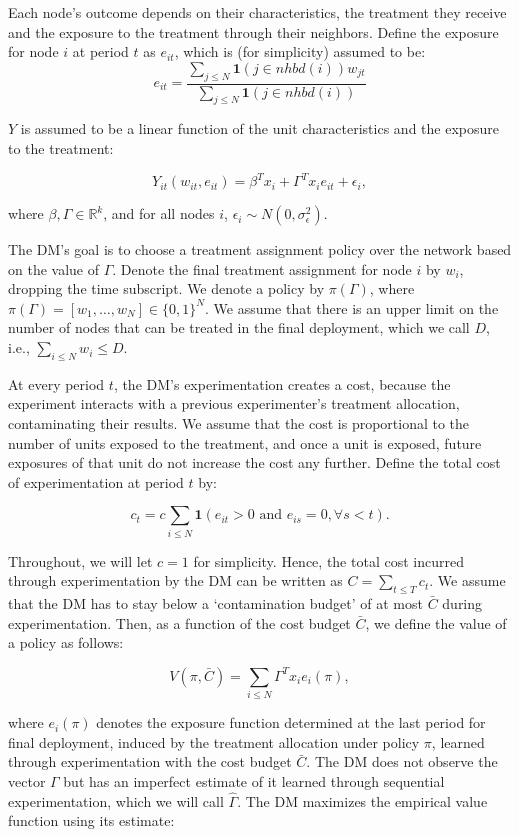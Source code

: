 \documentclass[11pt,a4paper]{article}
\begin{document}
Each node's outcome depends on their characteristics, the treatment they receive and the exposure to the treatment through their neighbors. Define the exposure for node $i$ at period $t$ as $e_{it}$, which is (for simplicity) assumed to be: 
$$e_{it} = \frac { \sum_{j \leq N}  \mathbf{1}(j \in nhbd(i)) w_{jt}}{ \sum_{j \leq N} \mathbf{1}(j \in nhbd(i)) }$$

$Y$ is assumed to be a linear function of the unit characteristics and the exposure to the treatment:

$$Y_{it}( w_{it}, e_{it}) = \beta^T x_i + \Gamma^T x_i e_{it} + \epsilon_i,$$

where $\beta, \Gamma \in \mathbb{R}^k$, and for all nodes $i$, $\epsilon_i \sim N(0, \sigma^2_\epsilon)$.

 The DM's goal is to choose a treatment assignment policy over the network based on the value of $\Gamma$. Denote the final treatment assignment for node $i$ by $w_i$, dropping the time subscript. We denote a policy by $\pi(\Gamma)$, where $\pi(\Gamma)=[w_1, \dots , w_N] \in \{0,1\}^N$. We assume that there is an upper limit on the number of nodes that can be treated in the final deployment, which we call $D$, i.e., $\sum_{i \leq N} w_i \leq D$. 

At every period $t$, the DM's experimentation creates a cost, because the experiment interacts with a previous experimenter's treatment allocation, contaminating their results. We assume that the cost is proportional to the number of units exposed to the treatment, and once a unit is exposed, future exposures of that unit do not increase the cost any further. Define the total cost of experimentation at period $t$ by:

$$c_t = c \sum_{i \leq N} \mathbf{1}\left( e_{it} > 0 \mbox{ and } e_{is}=0,  \forall s<t \right) .$$

Throughout, we will let $c=1$ for simplicity. Hence, the total cost incurred through experimentation by the DM can be written as   $C= \sum_{t \leq T} c_t  .$ We assume that the DM has to stay below a `contamination budget' of at most $\bar{C}$ during experimentation. Then, as a function of the cost budget $\bar{C}$, we define the value of a policy as follows:

$$V(\pi, \bar{C})=\sum_{i \leq N} \Gamma^T x_i e_i(\pi), $$

where $e_i(\pi)$ denotes the exposure function determined at the last period for final deployment, induced by the treatment allocation under policy $\pi$, learned through experimentation with the cost budget $\bar{C}$. The DM does not observe the vector $\Gamma$ but has an imperfect estimate of it learned through sequential experimentation, which we will call $\hat \Gamma$. The DM maximizes the empirical value function using its estimate:
\end{document}
